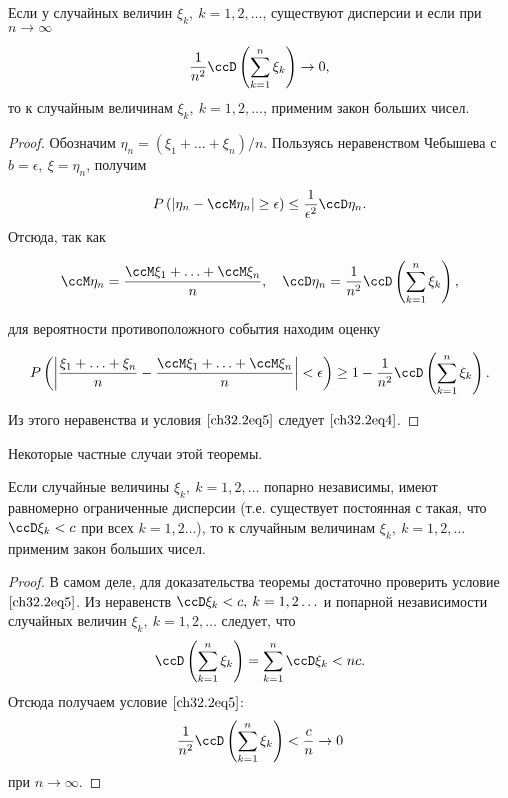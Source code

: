 \begin{thm} 
Если у случайных величин $\xi_k, \: k = 1,2,\ldots$, существуют дисперсии и если при $n \to \infty$

\begin{equation} \label{ch32.2eq5}
\frac{1}{n^2} \ccD \left( \sum_{k  = 1}^{n} \xi_k\right) \to 0,
\end{equation}
то к случайным величинам $\xi_k, \: k = 1,2,\ldots$, применим закон больших чисел.
\end{thm}

\begin{proof}
Обозначим $\eta_n = (\xi_1 + \ldots + \xi_n) / n$. Пользуясь неравенством Чебышева с $b = \epsilon, \: \xi = \eta_n$, получим

$$
P \left( \left| \eta_n - \ccM \eta_n \right| \ge \epsilon \right) \le \frac{1}{\epsilon^2} \ccD \eta_n.
$$
Отсюда, так как

$$
\ccM \eta_n = \frac{\ccM\xi_1 + \ldots + \ccM\xi_n}{n}, \quad \ccD\eta_n = \frac{1}{n^2} \ccD \left( \sum_{k  = 1}^{n} \xi_k\right),
$$
 
для вероятности противоположного события находим оценку

$$
P \left( \left| \frac{\xi_1 + \ldots + \xi_n}{n} - \frac{\ccM\xi_1 + \ldots + \ccM\xi_n}{n} \right| < \epsilon \right) \ge 1 - \frac{1}{n^2} \ccD \left( \sum_{k  = 1}^{n} \xi_k\right).
$$

Из этого неравенства и условия $\eqref{ch32.2eq5}$ следует $\eqref{ch32.2eq4}$.
\end{proof}

Некоторые частные случаи этой теоремы.

\begin{thm} 
Если случайные величины $\xi_k, \: k = 1,2,\ldots$ попарно независимы, имеют равномерно ограниченные дисперсии (т.е. существует постоянная с такая, что $\ccD \xi_k < c$ при всех $k = 1, 2\ldots$),	то к случайным величинам $\xi_k, \: k = 1,2,\ldots$ применим закон больших чисел.
\end{thm}

\begin{proof}
В самом деле, для доказательства теоремы достаточно проверить условие $\eqref{ch32.2eq5}$. Из неравенств $\ccD \xi_k < c, \: k = 1, 2\ldots$ и попарной независимости случайных величин $\xi_k, \: k = 1,2,\ldots$ следует, что
$$
\ccD \left( \sum_{k  = 1}^{n} \xi_k\right) = \sum_{k  = 1}^{n} \ccD \xi_k  < nc.
$$
Отсюда получаем условие $\eqref{ch32.2eq5}$:
$$
\frac{1}{n^2} \ccD \left( \sum_{k  = 1}^{n} \xi_k\right) < \frac{c}{n} \to 0
$$
при $n \to \infty$.
\end{proof}

